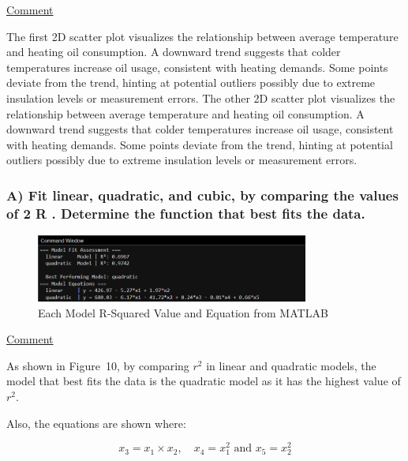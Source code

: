 \documentclass[12pt]{article}
\begin{document}
\begin{adjustwidth}{0cm}{0cm}
\uline{Comment}
\end{adjustwidth}
The first 2D scatter plot visualizes the relationship between average temperature and
heating oil consumption. A downward trend suggests that colder temperatures increase oil
usage, consistent with heating demands. Some points deviate from the trend, hinting at
potential outliers possibly due to extreme insulation levels or measurement errors.
The other 2D scatter plot visualizes the relationship between average temperature and
heating oil consumption. A downward trend suggests that colder temperatures increase oil
usage, consistent with heating demands. Some points deviate from the trend, hinting at
potential outliers possibly due to extreme insulation levels or measurement errors.


\subsubsection*{A) Fit linear, quadratic, and cubic, by comparing the values of 2 R . Determine the
function that best fits the data.}

\begin{figure}[H]
    \centering
    \includegraphics[width=0.8\textwidth]{10.png}
    \caption{Each Model R-Squared Value and Equation from MATLAB}
\end{figure}
\begin{adjustwidth}{0cm}{0cm}
\uline{Comment}
\end{adjustwidth}
As shown in Figure~10, by comparing \( r^2 \) in linear and quadratic models, the model that best fits the data is the quadratic model as it has the highest value of \( r^2 \). \\
\begin{adjustwidth}{0cm}{0cm}
Also, the equations are shown where:
\end{adjustwidth}
\[
x_3 = x_1 \times x_2, \quad x_4 = x_1^2 \text{ and } x_5 = x_2^2
\]
\end{document}
